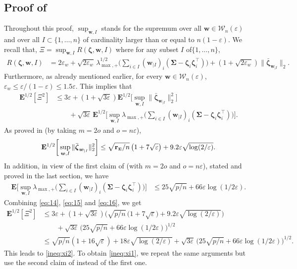 \documentclass[aos,preprint,reqno]{imsart}
\newcommand\bzeta{\boldsymbol\zeta}
\newcommand\bSigma{\boldsymbol\Sigma}
\newcommand\bfE{\mathbf E}
\newcommand\bw{\boldsymbol w}
\newcommand\rSigma{\textbf{\textup{r}}_{\scriptscriptstyle\bSigma}}
\theoremstyle{plain}
\theoremstyle{remark}
\begin{document}
	\subsection{Proof of }
	Throughout this proof,  $\sup_{\bw,I}$ stands for the supremum 
	over all $\bw\in\mathcal W_n(\varepsilon)$ and over all
	$I\subset\{1,\ldots,n\}$ of cardinality larger than or equal to
	$n(1-\varepsilon)$. We recall that, $\Xi = \sup_{\bw,I} R(\bzeta,
	\bw,I)$ where for any subset $I$ of$\{1,\ldots,n\}$,
	\begin{align} 
		R(\bzeta,\bw, I) 
			&= 2\varepsilon_{w}+\sqrt{2\varepsilon_{w}}\,\lambda_{\max,+}^{1/2}
			\bigg(\sum_{i\in I} (\bw_{| I})_i (\bSigma - 
			\bzeta_i\bzeta_i^\top)\bigg) + (1+\sqrt{2\varepsilon_{w}}) 
			\|\bar{\bzeta}_{\bw_{|I}}\|_2.
	\end{align}
	Furthermore, as already mentioned earlier, for every $\bw\in\mathcal W_n
	(\varepsilon)$, $\varepsilon_w\le \varepsilon/(1-\varepsilon)\le 1.5\varepsilon$. 
	This implies that 
	\begin{align} 
		\bfE^{1/2}[\Xi^2]
			&\le 3\varepsilon + (1+\sqrt{3\varepsilon}) 
			\bfE^{1/2}\bigg[\sup_{\bw,I}\|\bar{\bzeta}_{\bw_{|I}}\|_2^2\bigg]\\ 
			&\qquad + \sqrt{3\varepsilon}\,\bfE^{1/2}\bigg[\sup_{\bw,I}
			\lambda_{\max,+}\bigg(\sum_{i\in I} (\bw_{| I})_i (\bSigma - 
			\bzeta_i\bzeta_i^\top)\bigg) \bigg].\label{eq:14}
	\end{align}
	As proved in  (by taking $m=2o$ 
	and $o=n\varepsilon$),
	\begin{align} \label{eq:15}
		\bfE^{1/2}\bigg[\sup_{\bw,I}\|\bar{\bzeta}_{\bw_{|I}}\|_2^2\bigg] \le 
		{\sqrt{\rSigma/n}}\,\big(1+7\sqrt{\varepsilon}\big) + 9.2\varepsilon
		\sqrt{\log(2/\varepsilon)}.
	\end{align}
	In addition, in view of the first claim of  (with 
	$m=2o$ and $o=n\varepsilon$), stated and proved 
	in the last section, we have
	\begin{align} \label{eq:16}
		\bfE\bigg[\sup_{\bw,I}
			\lambda_{\max,+}\bigg(\sum_{i\in I} (\bw_{| I})_i (\bSigma - 
			\bzeta_i\bzeta_i^\top)\bigg) \bigg]
			&\le 25\sqrt{p/n} + 66\varepsilon \log(1/2\varepsilon).
	\end{align}
	Combining \eqref{eq:14}, \eqref{eq:15} and \eqref{eq:16}, we get 
	\begin{align} 
		\bfE^{1/2}[\Xi^2]
			&\le 3\varepsilon + (1+\sqrt{3\varepsilon}) 
			\big(\sqrt{p/n}\,\big(1+7\sqrt{\varepsilon}\big) + 9.2\varepsilon
			\sqrt{\log(2/\varepsilon)}\big)\\
			&\qquad + \sqrt{3\varepsilon}\,\big(25\sqrt{p/n} + 66\varepsilon 
			\log(1/2\varepsilon)\big)^{1/2}\\
			&\le \sqrt{p/n}(1+16\sqrt{\varepsilon}) 
			+ 18\varepsilon\sqrt{\log(2/\varepsilon)} + 
			\sqrt{3\varepsilon}\,\big(25\sqrt{p/n} + 66\varepsilon 
			\log(1/2\varepsilon)\big)^{1/2}.
	\end{align}
	This leads to \eqref{ineq:xi2}. To obtain \eqref{ineq:xi1}, we 
	repeat the same arguments but use the second claim of 
	 instead of the first one.
    
\end{document}
